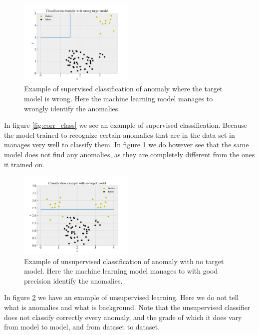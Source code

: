\documentclass[ reprint, amsmath,amssymb, aps, nofootinbib]{revtex4-2}
\begin{document}
\begin{figure}[H]
    \centering
    \includegraphics[width=0.49\textwidth]{figures/theory/wrong_class.pdf}
    \caption{Example of supervised classification of anomaly where the target model is wrong. Here the machine learning model manages to wrongly identify the anomalies. }
    \label{fig:wrong_class}
\end{figure}

In figure \ref{fig:corr_class} we see an example of supervised classification. Because the model trained to recognize certain anomalies that are in the data set in manages very well to classify them. In figure \ref{fig:wrong_class} we do however see that the same model does not find any anomalies, as they are completely different from the ones it trained on. 

\begin{figure}[H]
    \centering
    \includegraphics[width=0.49\textwidth]{figures/theory/unsuper.pdf}
    \caption{Example of unsupervised classification of anomaly with no target model. Here the machine learning model manages to with good precision identify the anomalies. }
    \label{fig:unsup_class}
\end{figure}

In figure \ref{fig:unsup_class} we have an example of unsupervised learning. Here we do not tell what is anomalies and what is background. Note that the unsupervised classifier does not classify correctly every anomaly, and the grade of which it does vary from model to model, and from dataset to dataset. 
\end{document}
